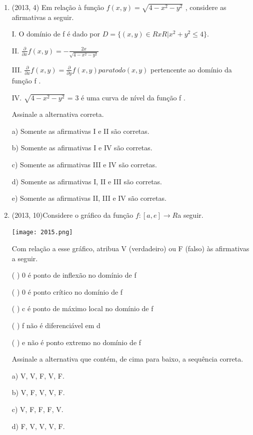 \documentclass{article}
\begin{document}
\begin{enumerate}
\item(2013, 4) Em relação à função $f (x, y) =\sqrt{4-x^2 - y^2}$ , considere as afirmativas a seguir.

I. O domínio de f é dado por $D = \{(x, y) ∈ R x R | x^2 + y^2 \leq 4\}.$

II. $\frac{\partial}{\partial x} f (x, y) = - \frac{2x}{\sqrt{4-x^2-y^2}}$

III. $\frac{\partial}{\partial x} f (x, y) = \frac{\partial}{\partial y} f (x, y) para todo (x, y)$ pertencente ao domínio da função f .

IV. $\sqrt{4-x^2-y^2}$ = 3 é uma curva de nível da função f .

Assinale a alternativa correta.

a) Somente as afirmativas I e II são corretas.

b) Somente as afirmativas I e IV são corretas.

c) Somente as afirmativas III e IV são corretas.

d) Somente as afirmativas I, II e III são corretas.

e) Somente as afirmativas II, III e IV são corretas.\newline









\item(2013, 10)Considere o gráfico da função $f : [a, e] \rightarrow R $a seguir.

\texttt{[image: 2015.png]}\newline


Com relação a esse gráfico, atribua V (verdadeiro) ou F (falso) às afirmativas a seguir.

( ) 0 é ponto de inflexão no domínio de f

( ) 0 é ponto crítico no domínio de f

( ) c é ponto de máximo local no domínio de f

( ) f não é diferenciável em d

( ) e não é ponto extremo no domínio de f

Assinale a alternativa que contém, de cima para baixo, a sequência correta.

a) V, V, F, V, F.

b) V, F, V, V, F.

c) V, F, F, F, V.

d) F, V, V, V, F.


\end{enumerate}
\end{document}
